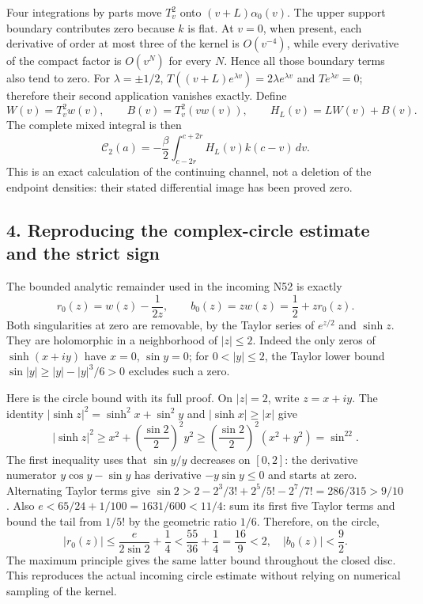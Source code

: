 \documentclass[
  10pt,
  a4paper,
]{article}
\begin{document}
Four integrations by parts move \(T_v^2\) onto \((v+L)\alpha_0(v)\). The
upper support boundary contributes zero because \(k\) is flat. At
\(v=0\), when present, each derivative of order at most three of the
kernel is \(O(v^{-4})\), while every derivative of the compact factor is
\(O(v^N)\) for every \(N\). Hence all those boundary terms also tend to
zero. For \(\lambda=\pm1/2\),
\(T((v+L)e^{\lambda v})=2\lambda e^{\lambda v}\) and
\(Te^{\lambda v}=0\); therefore their second application vanishes
exactly. Define \[
W(v)=T_v^2w(v),\qquad B(v)=T_v^2(vw(v)),\qquad
H_L(v)=LW(v)+B(v).
\tag{PT12}
\] The complete mixed integral is then \[
\boxed{\mathcal C_2(a)=-\frac\beta2\int_{c-2r}^{c+2r}
H_L(v)k(c-v)\,dv.}
\tag{PT13}
\] This is an exact calculation of the continuing channel, not a
deletion of the endpoint densities: their stated differential image has
been proved zero.

\subsection{4. Reproducing the complex-circle estimate and the strict
sign}\label{reproducing-the-complex-circle-estimate-and-the-strict-sign}

The bounded analytic remainder used in the incoming N52 is exactly \[
r_0(z)=w(z)-\frac1{2z},\qquad b_0(z)=zw(z)=\frac12+zr_0(z).
\tag{PT14}
\] Both singularities at zero are removable, by the Taylor series of
\(e^{z/2}\) and \(\sinh z\). They are holomorphic in a neighborhood of
\(|z|\le2\). Indeed the only zeros of \(\sinh(x+iy)\) have \(x=0\),
\(\sin y=0\); for \(0<|y|\le2\), the Taylor lower bound
\(\sin|y|\ge |y|-|y|^3/6>0\) excludes such a zero.

Here is the circle bound with its full proof. On \(|z|=2\), write
\(z=x+iy\). The identity \(|\sinh z|^2=\sinh^2x+\sin^2y\) and
\(|\sinh x|\ge|x|\) give \[
|\sinh z|^2\ge x^2+\left(\frac{\sin2}{2}\right)^2y^2
\ge\left(\frac{\sin2}{2}\right)^2(x^2+y^2)=\sin^22.
\tag{PT15}
\] The first inequality uses that \(\sin y/y\) decreases on \([0,2]\):
the derivative numerator \(y\cos y-\sin y\) has derivative
\(-y\sin y\le0\) and starts at zero. Alternating Taylor terms give
\(\sin2>2-2^3/3!+2^5/5!-2^7/7!=286/315>9/10\). Also
\(e<65/24+1/100=1631/600<11/4\): sum its first five Taylor terms and
bound the tail from \(1/5!\) by the geometric ratio \(1/6\). Therefore,
on the circle, \[
|r_0(z)|\le\frac{e}{2\sin2}+\frac14
<\frac{55}{36}+\frac14=\frac{16}{9}<2,
\quad |b_0(z)|<\frac92.
\tag{PT16}
\] The maximum principle gives the same latter bound throughout the
closed disc. This reproduces the actual incoming circle estimate without
relying on numerical sampling of the kernel.
\end{document}
